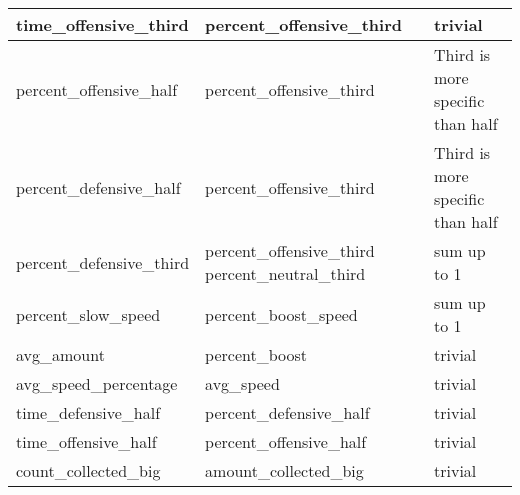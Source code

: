 \begin{table}[]
\begin{tabular}{|l|l|l|}
    time\_offensive\_third     & percent\_offensive\_third                           & trivial                                                                                                                    \\ \hline
    percent\_offensive\_half   & percent\_offensive\_third                           & Third is more specific than half                                                                                           \\ \hline
    percent\_defensive\_half   & percent\_offensive\_third                           & Third is more specific than half                                                                                           \\ \hline
    percent\_defensive\_third  & percent\_offensive\_third   percent\_neutral\_third & sum up to 1                                                                                                                \\ \hline
    percent\_slow\_speed       & percent\_boost\_speed                               & sum up to 1                                                                                                                \\ \hline
    avg\_amount                & percent\_boost                                      & trivial                                                                                                                    \\ \hline
    avg\_speed\_percentage     & avg\_speed                                          & trivial                                                                                                                    \\ \hline
    time\_defensive\_half      & percent\_defensive\_half                            & trivial                                                                                                                    \\ \hline
    time\_offensive\_half      & percent\_offensive\_half                            & trivial                                                                                                                    \\ \hline
    count\_collected\_big      & amount\_collected\_big                              & trivial                                                                                                                    \\ \hline

\end{tabular}
\end{table}
